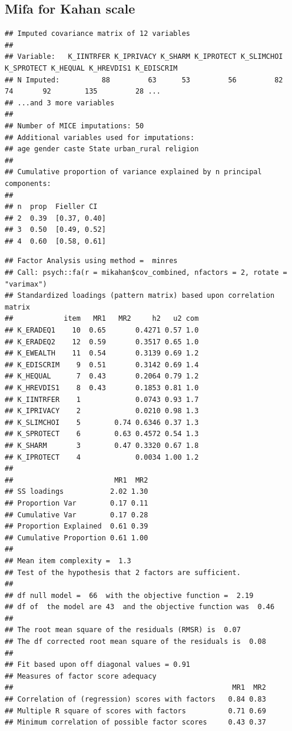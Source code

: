 \documentclass[
]{article}
\begin{document}
\hypertarget{mifa-for-kahan-scale}{%
\subsection{Mifa for Kahan scale}\label{mifa-for-kahan-scale}}

\begin{verbatim}
## Imputed covariance matrix of 12 variables
## 
## Variable:   K_IINTRFER K_IPRIVACY K_SHARM K_IPROTECT K_SLIMCHOI K_SPROTECT K_HEQUAL K_HREVDIS1 K_EDISCRIM 
## N Imputed:          88         63      53         56         82         74       92        135         28 ...
## ...and 3 more variables
## 
## Number of MICE imputations: 50
## Additional variables used for imputations:
## age gender caste State urban_rural religion
## 
## Cumulative proportion of variance explained by n principal components:
## 
## n  prop  Fieller CI    
## 2  0.39  [0.37, 0.40]  
## 3  0.50  [0.49, 0.52]  
## 4  0.60  [0.58, 0.61]
\end{verbatim}

\begin{verbatim}
## Factor Analysis using method =  minres
## Call: psych::fa(r = mikahan$cov_combined, nfactors = 2, rotate = "varimax")
## Standardized loadings (pattern matrix) based upon correlation matrix
##            item   MR1   MR2     h2   u2 com
## K_ERADEQ1    10  0.65       0.4271 0.57 1.0
## K_ERADEQ2    12  0.59       0.3517 0.65 1.0
## K_EWEALTH    11  0.54       0.3139 0.69 1.2
## K_EDISCRIM    9  0.51       0.3142 0.69 1.4
## K_HEQUAL      7  0.43       0.2064 0.79 1.2
## K_HREVDIS1    8  0.43       0.1853 0.81 1.0
## K_IINTRFER    1             0.0743 0.93 1.7
## K_IPRIVACY    2             0.0210 0.98 1.3
## K_SLIMCHOI    5        0.74 0.6346 0.37 1.3
## K_SPROTECT    6        0.63 0.4572 0.54 1.3
## K_SHARM       3        0.47 0.3320 0.67 1.8
## K_IPROTECT    4             0.0034 1.00 1.2
## 
##                        MR1  MR2
## SS loadings           2.02 1.30
## Proportion Var        0.17 0.11
## Cumulative Var        0.17 0.28
## Proportion Explained  0.61 0.39
## Cumulative Proportion 0.61 1.00
## 
## Mean item complexity =  1.3
## Test of the hypothesis that 2 factors are sufficient.
## 
## df null model =  66  with the objective function =  2.19
## df of  the model are 43  and the objective function was  0.46 
## 
## The root mean square of the residuals (RMSR) is  0.07 
## The df corrected root mean square of the residuals is  0.08 
## 
## Fit based upon off diagonal values = 0.91
## Measures of factor score adequacy             
##                                                    MR1  MR2
## Correlation of (regression) scores with factors   0.84 0.83
## Multiple R square of scores with factors          0.71 0.69
## Minimum correlation of possible factor scores     0.43 0.37
\end{verbatim}
\end{document}
